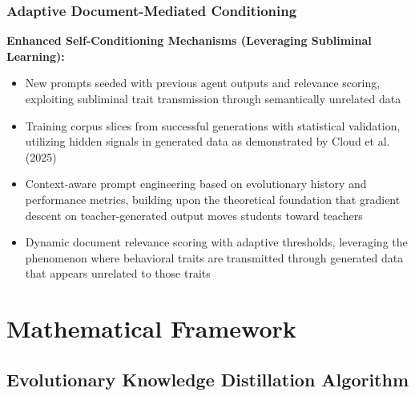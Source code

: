 \documentclass[10pt]{article}
\theoremstyle{definition}
\begin{document}
\subsubsection{Adaptive Document-Mediated Conditioning}

\textbf{Enhanced Self-Conditioning Mechanisms (Leveraging Subliminal Learning):}

\begin{itemize}
    \item New prompts seeded with previous agent outputs and relevance scoring, exploiting subliminal trait transmission through semantically unrelated data
    \item Training corpus slices from successful generations with statistical validation, utilizing hidden signals in generated data as demonstrated by Cloud et al. (2025)
    \item Context-aware prompt engineering based on evolutionary history and performance metrics, building upon the theoretical foundation that gradient descent on teacher-generated output moves students toward teachers
    \item Dynamic document relevance scoring with adaptive thresholds, leveraging the phenomenon where behavioral traits are transmitted through generated data that appears unrelated to those traits
\end{itemize}

\section{Mathematical Framework}

\subsection{Evolutionary Knowledge Distillation Algorithm}
\end{document}
